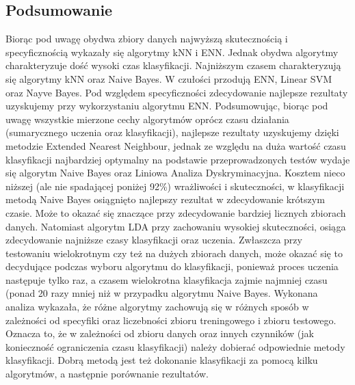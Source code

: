 \documentclass[[10pt,a4paper]{article}
\begin{document}
\subsection{Podsumowanie}
Biorąc pod uwagę obydwa zbiory danych najwyższą skutecznością i specyficznością wykazały się algorytmy kNN i ENN. Jednak obydwa algorytmy charakteryzuje dość wysoki czas klasyfikacji. Najniższym czasem charakteryzują się algorytmy kNN oraz Naive Bayes. W czułości przodują ENN, Linear SVM oraz Nayve Bayes. Pod względem specyficzności zdecydowanie najlepsze rezultaty uzyskujemy przy wykorzystaniu algorytmu ENN. 
Podsumowując, biorąc pod uwagę wszystkie mierzone cechy algorytmów oprócz czasu działania (sumarycznego uczenia oraz klasyfikacji), najlepsze rezultaty uzyskujemy dzięki metodzie Extended Nearest Neighbour, jednak ze względu na duża wartość czasu klasyfikacji najbardziej optymalny na podstawie przeprowadzonych testów wydaje się algorytm Naive Bayes oraz Liniowa Analiza Dyskryminacyjna. Kosztem nieco niższej (ale nie spadającej poniżej 92\%) wrażliwości i skuteczności, w klasyfikacji metodą Naive Bayes osiągnięto najlepszy rezultat w zdecydowanie krótszym czasie. Może to okazać się znaczące przy zdecydowanie bardziej licznych zbiorach danych. Natomiast algorytm LDA przy zachowaniu wysokiej skuteczności, osiąga zdecydowanie najniższe czasy klasyfikacji oraz uczenia. Zwłaszcza przy testowaniu wielokrotnym czy też na dużych zbiorach danych, może okazać się to decydujące podczas wyboru algorytmu do klasyfikacji, ponieważ proces uczenia następuje tylko raz, a czasem wielokrotna klasyfikacja zajmie najmniej czasu (ponad 20 razy mniej niż w przypadku algorytmu Naive Bayes.
Wykonana analiza wykazała, że różne algorytmy zachowują się w różnych sposób w zależności od specyfiki oraz liczebności zbioru treningowego i zbioru testowego. Oznacza to, że w zależności od zbioru danych oraz innych czynników (jak konieczność ograniczenia czasu klasyfikacji) należy dobierać odpowiednie metody klasyfikacji. Dobrą metodą jest też dokonanie klasyfikacji za pomocą kilku algorytmów, a następnie porównanie rezultatów.
\end{document}
